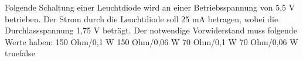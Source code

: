     {Folgende Schaltung einer Leuchtdiode wird an einer Betriebsspannung von 5,5 V betrieben. Der Strom durch die Leuchtdiode soll 25 mA betragen, wobei die Durchlassspannung 1,75 V beträgt. Der notwendige Vorwiderstand muss folgende Werte haben:}
    {150 Ohm/0,1 W}
    {150 Ohm/0,06 W}
    {70 Ohm/0,1 W}
    {70 Ohm/0,06 W}
    {true}{false}